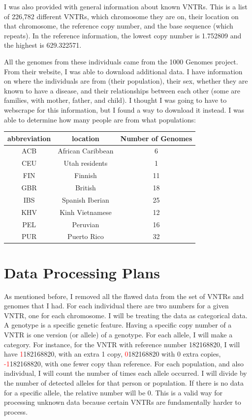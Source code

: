 \documentclass[]{article}
\begin{document}
I was also provided with general information about known VNTRs. This is a list of 226,782 different VNTRs, which chromosome they are on, their location on that chromosome, the reference copy number, and the base sequence (which repeats).  In the reference information, the lowest copy number is 1.752809 and the highest is 629.322571.  

All the genomes from these individuals came from the 1000 Genomes project. From their website, I was able to download additional data. I have information on where the individuals are from (their population), their sex, whether they are known to have a disease, and their relationships between each other (some are families, with mother, father, and child). I thought I was going to have to webscrape for this information, but I found a way to download it instead. I was able to determine how many people are from what populations:
\begin{center}
  \begin{tabular}{| c| c | c |}
      \hline
      abbreviation   & location & Number of Genomes \\ \hline
      ACB   & African Caribbean & 6 \\ \hline
      CEU   & Utah residents & 1 \\ \hline
      FIN   & Finnish & 11 \\ \hline
      GBR   & British & 18 \\ \hline
      IBS   & Spanish Iberian & 25 \\ \hline
      KHV   & Kinh Vietnamese & 12 \\ \hline
      PEL   & Peruvian & 16 \\ \hline
      PUR   & Puerto Rico & 32 \\ \hline
   \end{tabular}
 \end{center}
 
 
\section{Data Processing Plans}
As mentioned before, I removed all the flawed data from the set of VNTRs and genomes that I had.
For each individual there are two numbers for a given VNTR, one for each chromosome. I will be treating the data as categorical data. A genotype is a specific genetic feature. Having a specific copy number of a VNTR is one version (or allele) of a genotype. For each allele, I will make a category. For instance, for the VNTR with reference number 182168820, I will have \textcolor{red}{1}182168820, with an extra 1 copy, \textcolor{red}{0}182168820 with 0 extra copies, \textcolor{red}{-1}182168820, with one fewer copy than reference. For each population, and also individual, I will count the number of times each allele occurred. I will divide by the number of detected alleles for that person or population. If there is no data for a specific allele, the relative number will be 0. This is a valid way for processing unknown data because certain VNTRs are fundamentally harder to process. 
\end{document}
